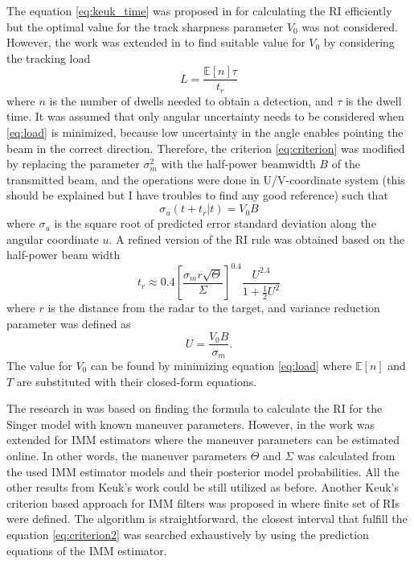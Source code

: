 \documentclass[english, 12pt, a4paper, elec, utf8, a-1b, online]{aaltothesis}
\newcommand{\E}[1]{\mathbb{E}\left[ #1 \right]}
\begin{document}
The equation \eqref{eq:keuk_time} was proposed in \cite{Keuk1975} for calculating the RI efficiently but the optimal value for the track sharpness parameter $V_0$ was not considered.
However, the work was extended in \cite{vanKeuk1993} to find suitable value for $V_0$ by considering the tracking load
\begin{equation}\label{eq:load}
    L = \frac{\E{n} \tau}{t_r}
\end{equation}
where $n$ is the number of dwells needed to obtain a detection, and $\tau$ is the dwell time.
It was assumed that only angular uncertainty needs to be considered when \eqref{eq:load} is minimized, 
because low uncertainty in the angle enables pointing the beam in the correct direction.
Therefore, the criterion \eqref{eq:criterion} was modified by replacing the parameter $\sigma_m^2$ with the half-power beamwidth $B$ of the transmitted beam, and the operations were done in U/V-coordinate system {\color{red}(this should be explained but I have troubles to find any good reference)} such that
\begin{equation} \label{eq:criterion2}
    \sigma_u(t + t_r | t) = V_0 B
\end{equation}
where $\sigma_u$ is the square root of predicted error standard deviation along the angular coordinate $u$. 
A refined version of the RI rule was obtained based on the half-power beam width
\begin{equation}\label{eq:van_keuk_revisited}
    t_r \approx 0.4 \left[ \frac{\sigma_m r \sqrt{\Theta}}{\Sigma} \right]^{0.4} \frac{U^{2.4}}{1+\frac{1}{2}U^2}
\end{equation}
where $r$ is the distance from the radar to the target, and variance reduction parameter was defined as
\begin{equation}
    U = \frac{V_0 B}{\sigma_m}.
\end{equation}
The value for $V_0$ can be found by minimizing equation \eqref{eq:load} where $\E{n}$ and $T$ are substituted with their closed-form equations.

The research in \cite{Keuk1975, vanKeuk1993} was based on finding the formula to calculate the RI for the Singer model with known maneuver parameters.
However, in \cite{Shin1995} the work was extended for IMM estimators where the maneuver parameters can be estimated online.
In other words, the maneuver parameters $\Theta$ and $\Sigma$ was calculated from the used IMM estimator models and their posterior model probabilities.
All the other results from Keuk's work could be still utilized as before.
Another Keuk's criterion based approach for IMM filters was proposed in \cite{Daeipour1994} where finite set of RIs were defined.
The algorithm is straightforward, the closest interval that fulfill the equation \eqref{eq:criterion2} was searched exhaustively by using the prediction equations of the IMM estimator.
\end{document}

